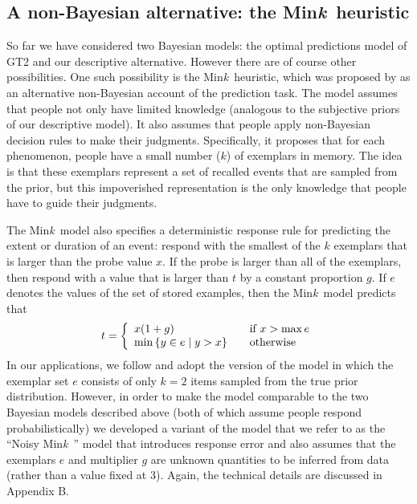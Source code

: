 \documentclass[doc,floatsintext]{apa6}
\newcommand{\mink}{{Min\textit{k}\ }}
\begin{document}
\subsection*{A non-Bayesian alternative: the \mink heuristic}

So far we have considered two Bayesian models: the optimal predictions model of GT2 and our descriptive alternative. However there are of course other possibilities. One such possibility is the \mink heuristic, which was proposed by  as an alternative non-Bayesian account of the prediction task. The model assumes that people not only have limited knowledge (analogous to the subjective priors of our descriptive model). It also assumes that people apply non-Bayesian decision rules to make their judgments. Specifically, it proposes that for each phenomenon, people have a small number ($k$) of exemplars in memory. The idea is that these exemplars represent a set of recalled events that are sampled from the prior, but this impoverished representation is the only knowledge that people have to guide their judgments.

The \mink model also specifies a deterministic response rule for predicting the extent or duration of an event: respond with the smallest of the $k$ exemplars that is larger than the probe value $x$. If the probe is larger than all of the exemplars, then respond with a value that is larger than $t$ by a constant proportion $g$. If $e$ denotes the values of the set of stored examples, then the \mink model predicts that
\begin{equation}
t =
\left\{
\begin{array}{l l}
	x(1+g) & \quad \text{if } x>\max{e}\\
	\min{\left\{{y \in e \mid y>x}\right\}} & \quad \text{otherwise}\\
\end{array} \right.
\end{equation}
In our applications, we follow  and adopt the version of the model in which the exemplar set $e$ consists of only $k=2$ items sampled from the true prior distribution. However, in order to make the model comparable to the two Bayesian models described above (both of which assume people respond probabilistically) we developed a variant of the model that we refer to as the ``Noisy \mink'' model that introduces response error and also assumes that the exemplars $e$ and multiplier $g$ are unknown quantities to be inferred from data (rather than a value fixed at 3). Again, the technical details are discussed in Appendix B.
\end{document}
